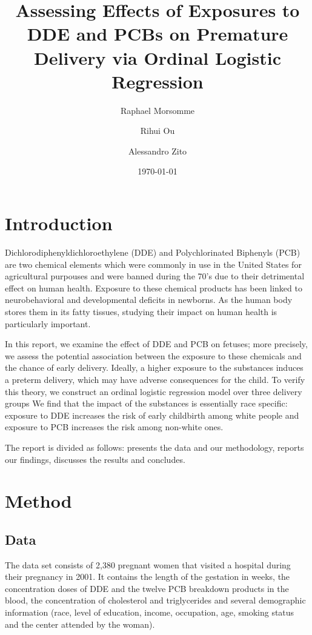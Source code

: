 \documentclass[wcp]{jmlr}%
\title[DDE and PCB effect on Premature delivery]{Assessing Effects of Exposures to DDE and PCBs on Premature Delivery via Ordinal Logistic Regression}	%
\author[Morsomme, Ou, Zito]{Raphael Morsomme \and Rihui Ou \and Alessandro Zito}
\date{\today} %
\begin{document}
\maketitle


\section{Introduction}
\label{sec:intro}

Dichlorodiphenyldichloroethylene (DDE) and Polychlorinated Biphenyls (PCB) are two chemical elements which were commonly in use in the United States for agricultural purpouses and were banned during the 70's due to their detrimental effect on human health. Exposure to these chemical products has been linked to neurobehavioral and developmental deficits in newborns. As the human body stores them in its fatty tissues, studying their impact on human health is particularly important.

In this report, we examine the effect of DDE and PCB on fetuses; more precisely, we assess the potential association between the exposure to these chemicals and the chance of early delivery. Ideally, a higher exposure to the substances induces a preterm delivery, which may have adverse consequences for the child. To verify this theory, we construct an ordinal logistic regression model over three delivery groups  We find that the impact of the substances is essentially race specific: exposure to DDE increases the risk of early childbirth among white people and exposure to PCB increases the risk among non-white ones. 

The report is divided as follows:  presents the data and our methodology,   reports our findings,  discusses the results and concludes.



\section{Method}
\label{sec:method}


\subsection{Data}
\label{sec:data}
The data set consists of 2,380 pregnant women that visited a hospital during their pregnancy in 2001. It contains the length of the gestation in weeks, the concentration doses of DDE and the twelve PCB breakdown products in the blood, the concentration of cholesterol and triglycerides and several demographic information (race, level of education, income, occupation, age, smoking status and the center attended by the woman).
\end{document}

